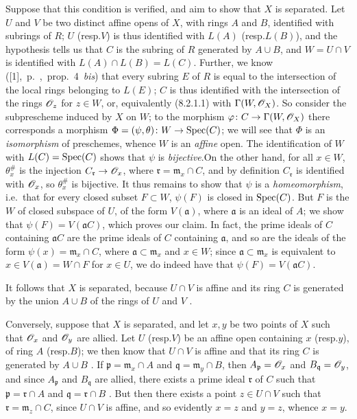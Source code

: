 \documentclass{book}
\begin{document}
Suppose that this condition is verified, and aim to show that $X$ is separated.
Let $U$ and $V$ be two distinct affine opens of $X$, with rings $A$ and $B$,
identified with subrings of $R$; $U$ (resp.$V$) is thus identified 
with $L(A)$ (resp.$L(B)$), and the hypothesis tells us  that $C$ is
the subring of $R$ generated by $A\cup B$, and $W=U\cap V$ is identified with
$L(A)\cap L(B)=L(C)$. Further, we know
([1],~p.~,~prop.~4~\emph{bis}) that every subring $E$ of $R$ is
equal to the intersection of the local rings belonging to $L(E)$; $C$ is thus
identified with the intersection of the rings $\mathscr{O}_z$ for $z\in W$, or,
equivalently (8.2.1.1) with $\Gamma(W,\mathscr{O}_X)$. So consider the subprescheme
induced by $X$ on $W$; to the  morphism $\varphi\colon
C\to\Gamma(W,\mathscr{O}_X)$ there corresponds  a morphism
$\Phi=(\psi,\theta)\colon W\to{\mathop{\mathrm{Spec}}\nolimits}(C)$; we will see that $\Phi$ is an
\emph{isomorphism} of preschemes, whence $W$ is an \emph{affine} open. The
identification of $W$ with $L(C)={\mathop{\mathrm{Spec}}\nolimits}(C)$ shows that $\psi$ is
\emph{bijective}.On the other hand, for all $x\in W$, $\theta_x^\#$ is the
injection $C_\mathfrak{r}\to\mathscr{O}_x$, where $\mathfrak{r}=\mathfrak{m}_x\cap C$,
and by definition $C_\mathfrak{r}$ is identified with $\mathscr{O}_x$, so $\theta_x^\#$
is bijective. It thus remains to show that $\psi$ is a \emph{homeomorphism},
i.e.\ that for every closed subset $F\subset W$, $\psi(F)$ is closed in
${\mathop{\mathrm{Spec}}\nolimits}(C)$. But $F$ is the  $W$ of closed subspace of $U$,
of the form $V(\mathfrak{a})$, where $\mathfrak{a}$ is an ideal of $A$; we show
that $\psi(F)=V(\mathfrak{a}C)$, which proves our claim. In fact, the prime
ideals of $C$ containing $\mathfrak{a}C$ are the prime ideals of $C$ containing
$\mathfrak{a}$, and so are the ideals of the form $\psi(x)=\mathfrak{m}_x\cap
C$, where $\mathfrak{a}\subset\mathfrak{m}_x$ and $x\in W$; since
$\mathfrak{a}\subset\mathfrak{m}_x$ is equivalent to $x\in V(\mathfrak{a})=W\cap
F$ for $x\in U$, we do indeed have that $\psi(F)=V(\mathfrak{a}C)$.

It follows that $X$ is separated, because $U\cap V$ is affine and its ring $C$
is generated by the union $A\cup B$ of the rings of $U$ and $V$ .

Conversely, suppose that $X$ is separated, and let $x,y$ be two points of $X$
such that $\mathscr{O}_x$ and $\mathscr{O}_y$ are allied. Let $U$ (resp.$V$) be an affine open
containing $x$ (resp.$y$), of ring $A$ (resp.$B$); we then know that $U\cap V$
is affine and that its ring $C$ is generated by $A\cup B$ . If
$\mathfrak{p}=\mathfrak{m}_x\cap A$ and $\mathfrak{q}=\mathfrak{m}_y\cap B$,
then $A_\mathfrak{p}=\mathscr{O}_x$ and $B_\mathfrak{q}=\mathscr{O}_y$, and since $A_\mathfrak{p}$
and $B_\mathfrak{q}$ are allied, there exists a prime ideal $\mathfrak{r}$ of
$C$ such that $\mathfrak{p}=\mathfrak{r}\cap A$ and
$\mathfrak{q}=\mathfrak{r}\cap B$ . But then there exists a point
$z\in U\cap V$ such that $\mathfrak{r}=\mathfrak{m}_z\cap C$, since $U\cap V$ is
affine, and so evidently $x=z$ and $y=z$, whence $x=y$.
\end{document}
